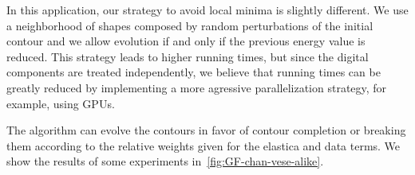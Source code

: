 \documentclass[review]{siamart220329}
\begin{document}
In this application, our strategy to avoid local minima is slightly different.
We use a neighborhood of shapes composed by random perturbations of the initial
contour and we allow evolution if and only if the previous energy value is
reduced. This strategy leads to higher running times, but since the digital
components are treated independently, we believe that running times can be
greatly reduced by implementing a more agressive parallelization strategy, for
example, using GPUs. 

The algorithm can evolve the contours in favor of contour completion or breaking
them according to the relative weights given for the elastica and data terms. We
show the results of some experiments in~\cref{fig:GF-chan-vese-alike}.

\begin{figure}
\center
{}
\end{figure}
\end{document}
